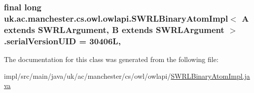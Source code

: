 \hypertarget{classuk_1_1ac_1_1manchester_1_1cs_1_1owl_1_1owlapi_1_1_s_w_r_l_binary_atom_impl_3_01_a_01extends733cb0b232fc39d6f31ee5b88a06cbcc_a23cca0947156b637c169600485f4212d}{
\subsubsection[{serial\-Version\-U\-I\-D}]{\setlength{\rightskip}{0pt plus 5cm}final long uk.\-ac.\-manchester.\-cs.\-owl.\-owlapi.\-S\-W\-R\-L\-Binary\-Atom\-Impl$<$ A extends {\bf S\-W\-R\-L\-Argument}, B extends {\bf S\-W\-R\-L\-Argument} $>$.serial\-Version\-U\-I\-D = 30406\-L\hspace{0.3cm}{\ttfamily [static]}, {\ttfamily [private]}}}\label{classuk_1_1ac_1_1manchester_1_1cs_1_1owl_1_1owlapi_1_1_s_w_r_l_binary_atom_impl_3_01_a_01extends733cb0b232fc39d6f31ee5b88a06cbcc_a23cca0947156b637c169600485f4212d}


The documentation for this class was generated from the following file\-:\begin{DoxyCompactItemize}
\item 
impl/src/main/java/uk/ac/manchester/cs/owl/owlapi/\hyperlink{_s_w_r_l_binary_atom_impl_8java}{S\-W\-R\-L\-Binary\-Atom\-Impl.\-java}\end{DoxyCompactItemize}
